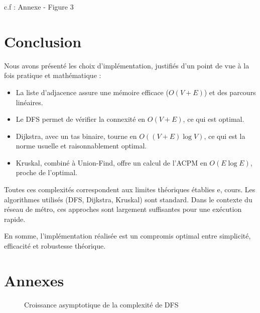 \documentclass[a4paper,12pt]{article}
\begin{document}
\begin{center}
c.f : Annexe - Figure 3
\end{center}

\section{Conclusion}

Nous avons présenté les choix d’implémentation, justifiés d’un point de vue à la fois pratique et mathématique :

\begin{itemize}
    \item La liste d’adjacence assure une mémoire efficace ($O(V+E)$) et des parcours linéaires.
    \item Le DFS permet de vérifier la connexité en $O(V+E)$, ce qui est optimal.
    \item Dijkstra, avec un tas binaire, tourne en $O((V+E)\log V)$, ce qui est la norme usuelle et raisonnablement optimal.
    \item Kruskal, combiné à Union-Find, offre un calcul de l’ACPM en $O(E \log E)$, proche de l’optimal.
\end{itemize}

Toutes ces complexités correspondent aux limites théoriques établies e, cours. Les algorithmes utilisés (DFS, Dijkstra, Kruskal) sont standard. Dans le contexte du réseau de métro, ces approches sont largement suffisantes pour une exécution rapide.

En somme, l’implémentation réalisée est un compromis optimal entre simplicité, efficacité et robustesse théorique.

\newpage

\section{Annexes}

\begin{figure}[!ht]
\centering
{}
\caption{Croissance asymptotique de la complexité de DFS}
\label{fig:dfs}
\end{figure}
\end{document}
